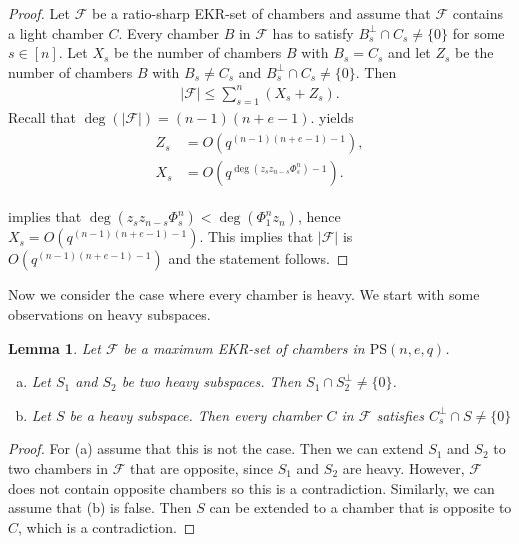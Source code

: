 \documentclass[11pt]{article}
\newtheorem{lemma}[thm]{Lemma}
\newcommand{\EKR}{\mathcal{F}}
\newcommand{\PS}{\mathrm{PS}}
\renewcommand{\le}{\leqslant}
\renewcommand{\leq}{\leqslant}
\begin{document}
\begin{proof}
Let $\EKR$ be a ratio-sharp EKR-set of chambers and assume that $\EKR$ contains a light chamber $C$.	Every chamber $B$ in $\EKR$ has to satisfy $B_{s}^\perp \cap C_s\neq \{0 \}$ for some $s \in [n]$. Let $X_s$ be the number of chambers $B$ with $B_s=C_s$ and let $Z_s$ be the number of chambers $B$ with $B_s\neq C_s$ and $B_{s}^\perp \cap C_s\neq \{0 \}$. Then
	\begin{align} \label{A: |F| light chamber}
		|\EKR|\leq \sum\limits_{s=1}^{n} (X_s+Z_s).
	\end{align}
	Recall that $\deg(|\EKR|)=(n-1)(n+e-1)$.
	 yields 
	\begin{align*}
		\begin{split}
			Z_s&=O(q^{(n-1)(n+e-1)-1}),\\                    %
			X_s&=O(q^{\deg(z_sz_{n-s}\Phi_s^n)-1}).       %
		\end{split}
	\end{align*}

 implies that $\deg(z_sz_{n-s} \Phi_s^n)<\deg(\Phi_1^nz_n)$, hence $X_s=O(q^{(n-1)(n+e-1)-1})$. This implies that $|\EKR|$ is $O(q^{(n-1)(n+e-1)-1})$ and the statement follows.	
\end{proof}



Now we consider the case where every chamber is heavy. We start with some observations on heavy subspaces.


\begin{lemma}
Let $\EKR$ be a maximum EKR-set of chambers in $\PS(n,e,q)$.
\begin{enumerate} [(a)]
    \item Let $S_1$ and $S_2$ be two heavy subspaces. Then $S_1\cap  S_2^\perp\neq \{0 \}$.
    \item Let $S$ be a heavy subspace. Then every chamber $C$ in $\EKR$ satisfies $C_s^\perp \cap S\neq \{ 0\}$
\end{enumerate}
\end{lemma}
\begin{proof}
    For (a) assume that this is not the case. Then we can extend $S_1$ and $S_2$ to two chambers in $\EKR$ that are opposite, since $S_1$ and $S_2$ are heavy. However, $\EKR$ does not contain opposite chambers so this is a contradiction. Similarly, we can assume that (b) is false. Then $S$ can be extended to a chamber that is opposite to $C$, which is a contradiction.	
\end{proof}
\end{document}
